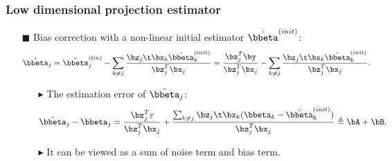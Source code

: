 \begin{frame}
\frametitle{Low dimensional projection estimator}
\begin{itemize}

\item[$\blacksquare$] Bias correction with a non-linear initial estimator $\hat{\bbeta}^{(init)}$:
\begin{equation}
\hat{\bbeta}_{j}=\hat{\bbeta}^{(lin)}_{j} - \sum_{k \neq j}\frac{\bz_{j}\t \bx_{k} \hat{\bbeta}^{(init)}_{k} }{\bz^{T}_{j} \bx_{j}}
=\frac{\bz^{T}_{j} \by}{\bz^{T}_{j} \bx_{j}} - \sum_{k \neq j}\frac{\bz_{j}\t \bx_{k} \hat{\bbeta}^{(init)}_{k} }{\bz^{T}_{j} \bx_{j}}.
\end{equation}
   \begin{itemize}
   \item[$\blacktriangleright$] The estimation error of $\hat{\bbeta}_{j}$:
   \begin{equation}
   \hat{\bbeta}_{j}-\bbeta_{j}=\frac{\bz^{T}_{j} \varepsilon}{\bz^{T}_{j} \bx_{j}} + \frac{\sum_{k \neq j} \bz_{j}\t \bx_{k} (\bbeta_{k} - \hat{\bbeta}^{(init)}_{k}) }{\bz^{T}_{j} \bx_{j}} \triangleq \bA + \bB.
   \end{equation}
   \item[$\blacktriangleright$] It can be viewed as a sum of noise term and bias term.
   \end{itemize}

\end{itemize}


\end{frame}


